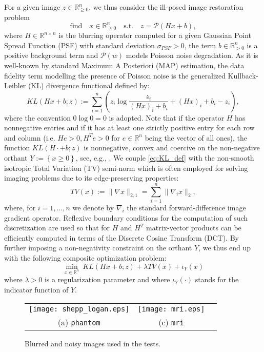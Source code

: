 \documentclass[conference]{IEEEtran}
\begin{document}
For a given image $z\in \mathbb{R}_{\geq 0}^n$, we thus consider the ill-posed image restoration problem 
$$
\text{find}\quad x\in\mathbb{R}_{\geq 0}^n\quad\text{s.t.}\quad z = \mathcal{P}\left(Hx + b \right),
$$
where $H\in\mathbb{R}^{n\times n}$ is the blurring operator computed for a given Gaussian Point Spread Function (PSF) with standard deviation $\sigma_{PSF}>0$, the term $b\in\mathbb{R}^n_{> 0}$ is a positive background term and $\mathcal{P}(w)$ models Poisson noise degradation. As it is well-known by standard Maximum A Posteriori (MAP) estimation, the data fidelity term modelling the presence of Poisson noise is the generalized Kullback-Leibler (KL) divergence functional defined by:
\small{
\begin{equation}  \label{eq:KL_def}
    KL(Hx+b;z) := \sum_{i=1}^n \left( z_i \log \frac{z_i}{(Hx)_i + b_i} + (Hx)_i + b_i - z_i \right),
\end{equation}}
\normalsize
where the convention $0 \log 0 = 0$ is adopted. Note that if the operator $H$ has nonnegative entries and if it has at least one strictly positive entry for each row and column (i.e. 
$He>0, H^Te>0$ for $e\in\mathbb{R}^n$ being the vector of all ones), the function $KL(H\cdot+b;z)$ is nonnegative, convex and coercive on the non-negative orthant $Y:= \left\{ x\geq 0 \right\}$, see, e.g., \cite{Harmany12}. 
We couple \eqref{eq:KL_def} with the non-smooth isotropic Total Variation (TV) semi-norm which is often employed for solving imaging problems due to its edge-preserving properties:
\begin{equation}   \label{eq:TV}
TV(x) := \| \nabla x \|_{2,1} = \sum_{i=1}^n \| \nabla_i x \|_2,
\end{equation}
where, for $i=1,\ldots,n$ we denote by $\nabla_i$  the standard forward-difference  image gradient operator. 
Reflexive boundary conditions for the computation of such discretization are used so that for $H$  and $H^T$ matrix-vector products can be efficiently computed in terms of the Discrete Cosine Transform (DCT). By further imposing a non-negativity constraint on the orthant $Y$, we thus  end up with the following composite optimization problem:
\begin{equation}  \label{pb:TV_KL}
    \min_{x\in\mathbb{R}^n}~ KL(Hx+b;z) + \lambda TV(x) + \iota_Y(x)
\end{equation}
where $\lambda>0$ is a regularization parameter and where $\iota_Y(\cdot)$ stands for the indicator function of  $Y$.




\begin{figure}[t!]
\begin{center}
\begin{tabular}{ccc}
    \texttt{[image: shepp\_logan.eps]} 
  &
    \texttt{[image: mri.eps]} \\
  (a) \texttt{phantom}
 &
    (c) \texttt{mri}
\end{tabular}
    \caption{Blurred and noisy images used in the tests.}
    \label{fig:test_images}
\end{center}
\end{figure}
\end{document}
